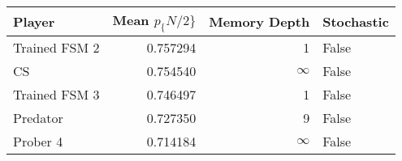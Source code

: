 \begin{tabular}{lrrl}
\toprule
        Player &  Mean $p_\{N/2\}$ &  Memory Depth & Stochastic \\
\midrule
 Trained FSM 2 &        0.757294 &             1 &      False \\
            CS &        0.754540 &            \(\infty\) &      False \\
 Trained FSM 3 &        0.746497 &             1 &      False \\
      Predator &        0.727350 &             9 &      False \\
      Prober 4 &        0.714184 &            \(\infty\) &      False \\
\bottomrule
\end{tabular}
